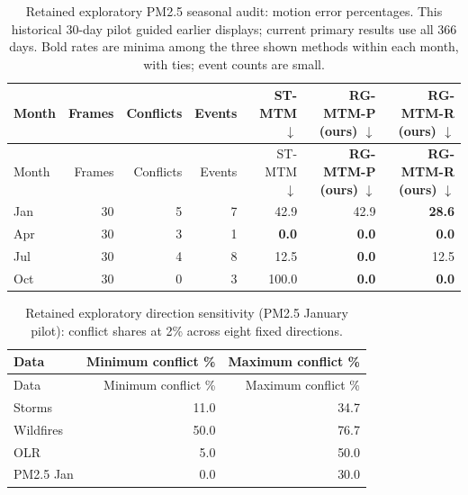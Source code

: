 \begingroup\small\setlength{\tabcolsep}{4pt}
\begin{longtable}{lrrrrrr}
\caption{Retained exploratory PM2.5 seasonal audit: motion error percentages. This historical 30-day pilot guided earlier displays; current primary results use all 366 days. Bold rates are minima among the three shown methods within each month, with ties; event counts are small.}\\\toprule
Month & Frames & Conflicts & Events & ST-MTM $\downarrow$ & \textbf{RG-MTM-P (ours)} $\downarrow$ & \textbf{RG-MTM-R (ours)} $\downarrow$\\\midrule\endfirsthead
\toprule Month & Frames & Conflicts & Events & ST-MTM $\downarrow$ & \textbf{RG-MTM-P (ours)} $\downarrow$ & \textbf{RG-MTM-R (ours)} $\downarrow$\\\midrule\endhead
\bottomrule\endfoot
Jan & 30 & 5 & 7 & 42.9 & 42.9 & \textbf{28.6}\\
Apr & 30 & 3 & 1 & \textbf{0.0} & \textbf{0.0} & \textbf{0.0}\\
Jul & 30 & 4 & 8 & 12.5 & \textbf{0.0} & 12.5\\
Oct & 30 & 0 & 3 & 100.0 & \textbf{0.0} & \textbf{0.0}\\
\end{longtable}\endgroup

\begingroup\small\setlength{\tabcolsep}{4pt}
\begin{longtable}{lrr}
\caption{Retained exploratory direction sensitivity (PM2.5 January pilot): conflict shares at 2\% across eight fixed directions.}\\\toprule
Data & Minimum conflict \% & Maximum conflict \%\\\midrule\endfirsthead
\toprule Data & Minimum conflict \% & Maximum conflict \%\\\midrule\endhead
\bottomrule\endfoot
Storms & 11.0 & 34.7\\
Wildfires & 50.0 & 76.7\\
OLR & 5.0 & 50.0\\
PM2.5 Jan & 0.0 & 30.0\\
\end{longtable}\endgroup
